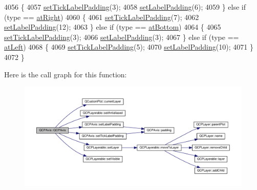 \begin{DoxyCode}
4056   \{
4057     \hyperlink{class_q_c_p_axis_af302c479af9dbc2e9f0e44e07c0012ee}{setTickLabelPadding}(3);
4058     \hyperlink{class_q_c_p_axis_a4391192a766e5d20cfe5cbc17607a7a2}{setLabelPadding}(6);
4059   \} \textcolor{keywordflow}{else} \textcolor{keywordflow}{if} (type == \hyperlink{class_q_c_p_axis_ae2bcc1728b382f10f064612b368bc18aadf5509f7d29199ef2f263b1dd224b345}{atRight})
4060   \{
4061     \hyperlink{class_q_c_p_axis_af302c479af9dbc2e9f0e44e07c0012ee}{setTickLabelPadding}(7);
4062     \hyperlink{class_q_c_p_axis_a4391192a766e5d20cfe5cbc17607a7a2}{setLabelPadding}(12);
4063   \} \textcolor{keywordflow}{else} \textcolor{keywordflow}{if} (type == \hyperlink{class_q_c_p_axis_ae2bcc1728b382f10f064612b368bc18aa220d68888516b6c3b493d144f1ba438f}{atBottom})
4064   \{
4065     \hyperlink{class_q_c_p_axis_af302c479af9dbc2e9f0e44e07c0012ee}{setTickLabelPadding}(3);
4066     \hyperlink{class_q_c_p_axis_a4391192a766e5d20cfe5cbc17607a7a2}{setLabelPadding}(3);
4067   \} \textcolor{keywordflow}{else} \textcolor{keywordflow}{if} (type == \hyperlink{class_q_c_p_axis_ae2bcc1728b382f10f064612b368bc18aaf84aa6cac6fb6099f54a2cbf7546b730}{atLeft})
4068   \{
4069     \hyperlink{class_q_c_p_axis_af302c479af9dbc2e9f0e44e07c0012ee}{setTickLabelPadding}(5);
4070     \hyperlink{class_q_c_p_axis_a4391192a766e5d20cfe5cbc17607a7a2}{setLabelPadding}(10);
4071   \}
4072 \}
\end{DoxyCode}


Here is the call graph for this function\+:\nopagebreak
\begin{figure}[H]
\begin{center}
\leavevmode
\includegraphics[width=350pt]{class_q_c_p_axis_ac62c042968bae0e6d474fcfc57c9b71f_cgraph}
\end{center}
\end{figure}


\hypertarget{class_q_c_p_axis_a7cfa27ea9da0bb1fe0ae995572c0b85d}{}
